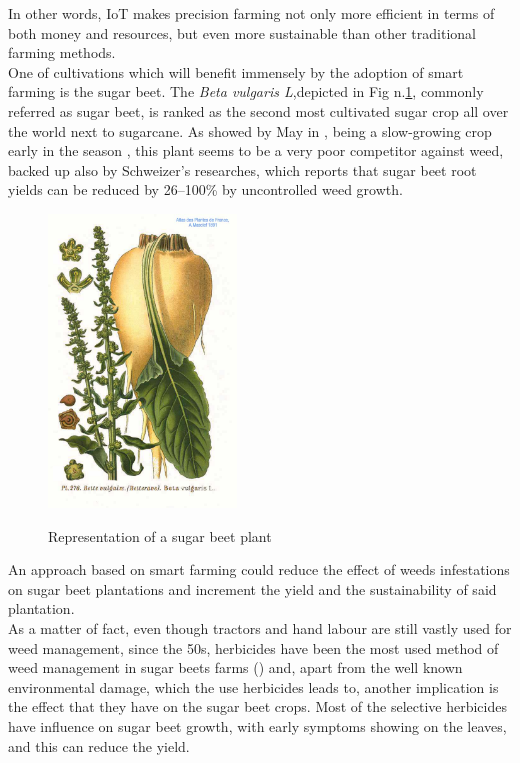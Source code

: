 In other words, IoT makes precision farming not only more efficient in terms of both money and resources, but even more sustainable than other traditional farming methods. \\
One of cultivations which will benefit immensely by the adoption of smart farming is the sugar beet. The \textit{Beta vulgaris L},depicted in Fig n.\ref{fig:sugar_beet}, commonly referred as sugar beet, is ranked as the second most cultivated  sugar crop all over the world next to sugarcane\cite{bhadra_weed_2020}. As showed by May in \cite{may_economic_2003}, being a slow-growing crop early in the season \cite{bhadra_weed_2020}, this plant seems to be a very poor competitor against weed, backed up also by Schweizer's researches, which reports that sugar beet root yields can be reduced by 26–100\% by uncontrolled weed growth.  \cite{schweizer_weed_1989}\\
\begin{figure}[ht]
	\centering
	\includegraphics[width = 5cm]{img/276_Beta_vulgaris_L.jpg}
	\caption[Representation of a sugar beet plant]{Representation of a sugar beet plant \cite{masclef_sugar_1891} }{\centering}
	\label{fig:sugar_beet}
\end{figure}
An approach based on smart farming could reduce the effect of weeds infestations on sugar beet plantations and  increment the yield and the sustainability of said plantation.\\
As a matter of fact, even though tractors and hand labour are still vastly used for weed management, since the 50s, herbicides have been the most used method of weed management in sugar beets farms (\cite{cioni_weed_2010}) and, apart from the well known environmental damage, which the use herbicides leads to, another implication is the effect that they have on the sugar beet crops. Most of the selective herbicides have influence on sugar beet growth, with early symptoms showing on the leaves, and this can reduce the yield. \cite{petersen_review_2004}\\
